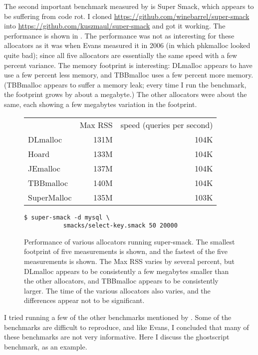 \documentclass[natbib,sort&compress,10pt]{sigplanconf}
\begin{document}
The second important benchmark measured by \cite{Evans06} is Super
Smack, which appears to be suffering from code rot.  I cloned
\url{https://github.com/winebarrel/super-smack} into
\url{https://github.com/kuszmaul/super-smack} and got it working.  The
performance is shown in .  The performance was not
as interesting for these allocators as it was when Evans measured it
in 2006 (in which phkmalloc looked quite bad); since all five
allocators are essentially the same speed with a few percent variance.
The memory footprint is interesting: DLmalloc appears to have use a
few percent less memory, and TBBmalloc uses a few percent more
memory. (TBBmalloc appears to suffer a memory leak; every time I run
the benchmark, the footprint grows by about a megabyte.)  The other
allocators were about the same, each showing a few megabytes variation
in the footprint.

\begin{figure}
\begin{center}
\begin{tabular}{lrr}
 & Max RSS & speed (queries per second)\\
 DLmalloc     &131M  &  104K \\
 Hoard        &133M  &  104K \\
 JEmalloc     &137M  &  104K \\
 TBBmalloc    &140M  &  104K \\
 SuperMalloc  &135M  &  103K
\end{tabular}
\end{center}
\begin{verbatim}
$ super-smack -d mysql \
           smacks/select-key.smack 50 20000
\end{verbatim}
\caption{Performance of various allocators running super-smack.  The
  smallest footprint of five measurements is shown, and the fastest of
  the five measurements is shown.  The Max RSS varies by several
  percent, but DLmalloc appears to be consistently a few megabytes
  smaller than the other allocators, and TBBmalloc appears to be
  consistently larger.  The time of the various allocators also
  varies, and the differences appear not to be significant.}
\label{fig:supersmack}
\end{figure}

I tried running a few of the other benchmarks mentioned by
\cite{Evans06}.  Some of the benchmarks are difficult to reproduce,
and like Evans, I concluded that many of these benchmarks are not very
informative.  Here I discuss the ghostscript benchmark, as an example.
\end{document}
